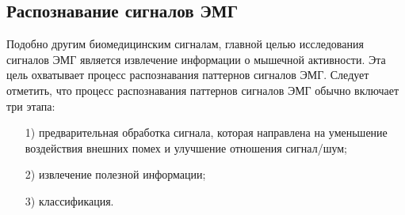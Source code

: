 \subsection{Распознавание сигналов ЭМГ}

Подобно другим биомедицинским сигналам, главной целью исследования сигналов ЭМГ является извлечение информации о мышечной активности. Эта цель охватывает процесс распознавания паттернов сигналов ЭМГ. Следует отметить, что процесс распознавания паттернов сигналов ЭМГ обычно включает три этапа:

\begin{itemize}
    \item[1)] предварительная обработка сигнала, которая направлена на уменьшение воздействия внешних помех и улучшение отношения сигнал/шум;
    \item[2)] извлечение полезной информации;
    \item[3)] классификация.
\end{itemize}

